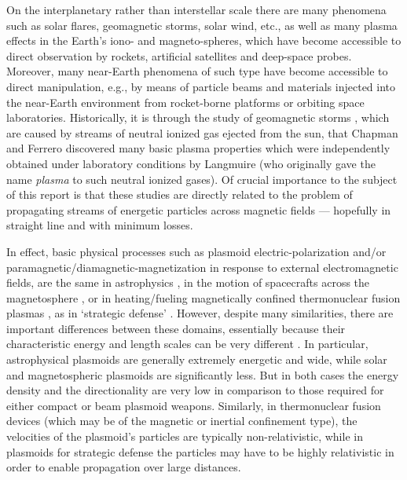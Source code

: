 \documentclass [12pt,a4paper,     ]{report} %
\begin{document}
   On the interplanetary rather than interstellar scale there are many phenomena such as solar flares, geomagnetic storms, solar wind, etc., as well as many plasma effects in the Earth's iono- and magneto-spheres, which have become accessible to direct observation by rockets, artificial satellites and deep-space probes.  Moreover, many near-Earth phenomena of such type have become accessible to direct manipulation, e.g., by means of particle beams \cite{GOUGH1980-,KIWAM1977-,NEUPE1982-,GRAND1982-, OBAYA1984-, WINCK1984-, ARNOL1985-,  WINGL1987A, WINGL1987B, WINGL1987C, LIVES1989-} and materials \cite{HAERD1986-} injected into the near-Earth environment from rocket-borne platforms or orbiting space laboratories.   Historically, it is through the study of geomagnetic storms \cite{CHAPM1960-}, which are caused by streams of neutral ionized gas ejected from the sun, that Chapman and Ferrero discovered many basic plasma properties which were independently obtained under laboratory conditions by Langmuire (who originally gave the name \emph{plasma} to such neutral ionized gases).  Of crucial importance to the subject of this report is that these studies are directly related to the problem of propagating streams of energetic particles across magnetic fields --- hopefully in straight line and with minimum losses.

   In effect, basic physical processes such as plasmoid electric-polarization and/or paramagnetic/diamagnetic-magnetization in response to external electromagnetic fields, are the same in astrophysics \cite{CHAPM1960-, ABE--2001-}, in the motion of spacecrafts across the magnetosphere \cite{DRELL1965-}, or in heating/fueling magnetically confined thermonuclear fusion plasmas \cite{TUCK-1959-,SCHMI1960-,MANHE1977-,PARKS1988-,BRENN2005-}, as in `strategic defense' \cite[p.3554]{HEIDB1992-}.  However, despite many similarities, there are important differences between these domains, essentially because their characteristic energy and length scales can be very different \cite[Table.II]{WESSE1990-}.  In particular, astrophysical plasmoids are generally extremely energetic and wide, while solar and magnetospheric plasmoids are significantly less.  But in both cases the energy density and the directionality are very low in comparison to those required for either compact or beam plasmoid weapons.  Similarly, in thermonuclear fusion devices (which may be of the magnetic or inertial confinement type), the velocities of the plasmoid's particles are typically non-relativistic, while in plasmoids for strategic defense the particles may have to be highly relativistic in order to enable propagation over large distances.
\end{document}
